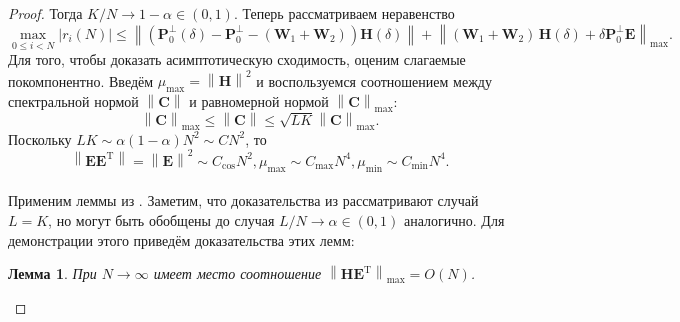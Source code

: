 \documentclass[specialist,
               substylefile = spbu_report.rtx,
               subf,href,colorlinks=true, 12pt]{disser}
\newcommand\norm[1]{\left\|#1\right\|}
\newtheorem{lemma}{Лемма}
\begin{document}
\begin{proof}
Тогда $K/N \rightarrow 1 - \alpha \in (0,1)$. 
Теперь рассматриваем неравенство
\begin{equation*}
	\max_{0\leqslant i<N} |r_i(N)|\leqslant \norm{(\mathbf{P}_0^\bot(\delta)- \mathbf{P}_0^\bot-(\mathbf{W}_1+\mathbf{W}_2))\mathbf{H}(\delta)} + \norm{ (\mathbf{W}_1+\mathbf{W}_2)\, \mathbf{H}(\delta) + \delta \mathbf{P}_0^\perp \mathbf{E}}_{\max}.
\end{equation*}
Для того, чтобы доказать асимптотическую сходимость, оценим слагаемые покомпонентно. Введём $\mu_{\max} = \norm{\mathbf{H}}^2$ и воспользуемся соотношением между спектральной нормой $\norm{\mathbf{C}}$ и равномерной нормой $\norm{\mathbf{C}}_{\max}$:
\begin{equation*}
	\norm{\mathbf{C}}_{\max} \leqslant\norm{\mathbf{C} }\leqslant \sqrt{LK}\norm{\mathbf{C}}_{\max}.
\end{equation*}
Поскольку $LK\sim \alpha(1-\alpha)N^2\sim CN^2$, то \begin{equation}
	\norm{\mathbf{EE}^\mathrm{T}} = \norm{\mathbf{E}}^2\sim C_{\cos}N^2, \mu_{\max} \sim C_{\max}N^4, \mu_{\min} \sim C_{\min}N^4.\label{eq:asymp_1}
\end{equation}
\\Применим леммы из \cite{ZNekrutkin}. Заметим, что доказательства из \cite{ZNekrutkin}  рассматривают случай $L=K$, но могут быть обобщены до случая $L/N\rightarrow\alpha\in(0,1)$ аналогично. Для демонстрации этого приведём доказательства этих лемм:
\begin{lemma}\label{lem:2}
	При $N\rightarrow\infty$ имеет место соотношение $\norm{\mathbf{HE}^\mathrm{T}}_{\max} = O(N)$.
\end{lemma}


\end{proof}
\end{document}
